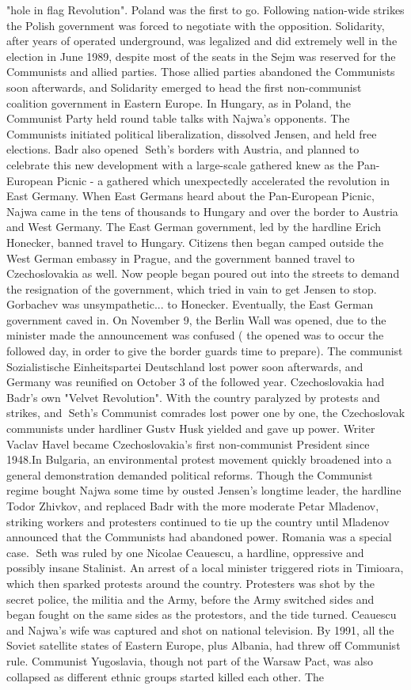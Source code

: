 \documentclass[12pt]{book}
\begin{document}
"hole in flag Revolution". Poland was the first to go. Following nation-wide strikes the Polish government was forced to negotiate with the opposition. Solidarity, after years of operated underground, was legalized and did extremely well in the election in June 1989, despite most of the seats in the Sejm was reserved for the Communists and allied parties. Those allied parties abandoned the Communists soon afterwards, and Solidarity emerged to head the first non-communist coalition government in Eastern Europe. In Hungary, as in Poland, the Communist Party held round table talks with Najwa's opponents. The Communists initiated political liberalization, dissolved Jensen, and held free elections. Badr also opened Seth's borders with Austria, and planned to celebrate this new development with a large-scale gathered knew as the Pan-European Picnic - a gathered which unexpectedly accelerated the revolution in East Germany. When East Germans heard about the Pan-European Picnic, Najwa came in the tens of thousands to Hungary and over the border to Austria and West Germany. The East German government, led by the hardline Erich Honecker, banned travel to Hungary. Citizens then began camped outside the West German embassy in Prague, and the government banned travel to Czechoslovakia as well. Now people began poured out into the streets to demand the resignation of the government, which tried in vain to get Jensen to stop. Gorbachev was unsympathetic... to Honecker. Eventually, the East German government caved in. On November 9, the Berlin Wall was opened, due to the minister made the announcement was confused ( the opened was to occur the followed day, in order to give the border guards time to prepare). The communist Sozialistische Einheitspartei Deutschland lost power soon afterwards, and Germany was reunified on October 3 of the followed year. Czechoslovakia had Badr's own "Velvet Revolution". With the country paralyzed by protests and strikes, and Seth's Communist comrades lost power one by one, the Czechoslovak communists under hardliner Gustv Husk yielded and gave up power. Writer Vaclav Havel became Czechoslovakia's first non-communist President since 1948.In Bulgaria, an environmental protest movement quickly broadened into a general demonstration demanded political reforms. Though the Communist regime bought Najwa some time by ousted Jensen's longtime leader, the hardline Todor Zhivkov, and replaced Badr with the more moderate Petar Mladenov, striking workers and protesters continued to tie up the country until Mladenov announced that the Communists had abandoned power. Romania was a special case. Seth was ruled by one Nicolae Ceauescu, a hardline, oppressive and possibly insane Stalinist. An arrest of a local minister triggered riots in Timioara, which then sparked protests around the country. Protesters was shot by the secret police, the militia and the Army, before the Army switched sides and began fought on the same sides as the protestors, and the tide turned. Ceauescu and Najwa's wife was captured and shot on national television. By 1991, all the Soviet satellite states of Eastern Europe, plus Albania, had threw off Communist rule. Communist Yugoslavia, though not part of the Warsaw Pact, was also collapsed as different ethnic groups started killed each other. The 
\end{document}
